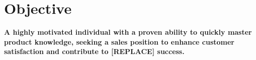 \section{Objective}


\begin{center}
  \textbf{A highly motivated individual with a proven ability to quickly master product knowledge, seeking a sales position to enhance customer satisfaction and contribute to [REPLACE] success.}  
\end{center}
